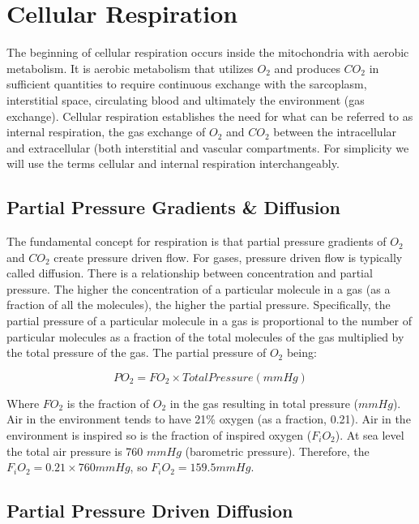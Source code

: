 \section{Cellular Respiration}

The beginning of cellular respiration occurs inside the mitochondria with aerobic metabolism. It is aerobic metabolism that utilizes $O_2$ and produces $CO_2$ in sufficient quantities to require continuous exchange with the sarcoplasm, interstitial space, circulating blood and ultimately the environment (gas exchange). Cellular respiration establishes the need for what can be referred to as internal respiration, the gas exchange of $O_2$ and $CO_2$ between the intracellular and extracellular (both interstitial and vascular compartments. For simplicity we will use the terms cellular and internal respiration interchangeably.

\subsection{Partial Pressure Gradients \& Diffusion}

The fundamental concept for respiration is that partial pressure gradients of $O_2$ and $CO_2$ create pressure driven flow. For gases, pressure driven flow is typically called diffusion. There is a relationship between concentration and partial pressure. The higher the concentration of a particular molecule in a gas (as a fraction of all the molecules), the higher the partial pressure. Specifically, the partial pressure of a particular molecule in a gas is proportional to the number of particular molecules as a fraction of the total molecules of the gas multiplied by the total pressure of the gas. The partial pressure of $O_2$ being:

\begin{equation}
    PO_2 = FO_2 \times Total Pressure (mmHg)
    \label{PO2}
\end{equation}

Where $FO_2$ is the fraction of $O_2$ in the gas resulting in total pressure ($mmHg$). Air in the environment tends to have 21\% oxygen (as a fraction, 0.21). Air in the environment is inspired so is the fraction of inspired oxygen ($F_iO_2$). At sea level the total air pressure is 760 $mmHg$ (barometric pressure). Therefore, the $F_iO_2 = 0.21 \times 760 mmHg$, so $F_iO_2 = 159.5 mmHg$. 

\subsection{Partial Pressure Driven Diffusion}

